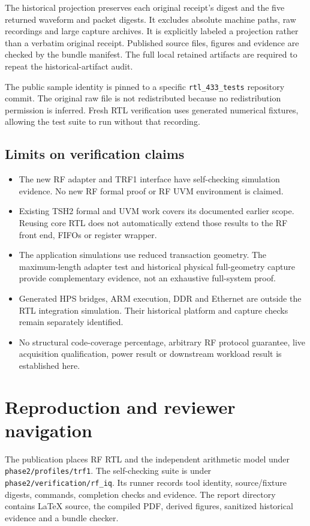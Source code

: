 \documentclass[11pt,letterpaper]{article}
\newcommand{\artifact}[1]{\nolinkurl{#1}}
\begin{document}
The historical projection preserves each original receipt's digest and the five returned waveform and packet digests. It excludes absolute machine paths, raw recordings and large capture archives. It is explicitly labeled a projection rather than a verbatim original receipt. Published source files, figures and evidence are checked by the bundle manifest. The full local retained artifacts are required to repeat the historical-artifact audit.

The public sample identity is pinned to a specific \texttt{rtl\_433\_tests} repository commit. The original raw file is not redistributed because no redistribution permission is inferred. Fresh RTL verification uses generated numerical fixtures, allowing the test suite to run without that recording.

\subsection{Limits on verification claims}
\begin{itemize}
\item The new RF adapter and TRF1 interface have self-checking simulation evidence. No new RF formal proof or RF UVM environment is claimed.
\item Existing TSH2 formal and UVM work covers its documented earlier scope. Reusing core RTL does not automatically extend those results to the RF front end, FIFOs or register wrapper.
\item The application simulations use reduced transaction geometry. The maximum-length adapter test and historical physical full-geometry capture provide complementary evidence, not an exhaustive full-system proof.
\item Generated HPS bridges, ARM execution, DDR and Ethernet are outside the RTL integration simulation. Their historical platform and capture checks remain separately identified.
\item No structural code-coverage percentage, arbitrary RF protocol guarantee, live acquisition qualification, power result or downstream workload result is established here.
\end{itemize}

\newpage
\section{Reproduction and reviewer navigation}
The publication places RF RTL and the independent arithmetic model under \artifact{phase2/profiles/trf1}. The self-checking suite is under \artifact{phase2/verification/rf_iq}. Its runner records tool identity, source/fixture digests, commands, completion checks and evidence. The report directory contains LaTeX source, the compiled PDF, derived figures, sanitized historical evidence and a bundle checker.
\end{document}
